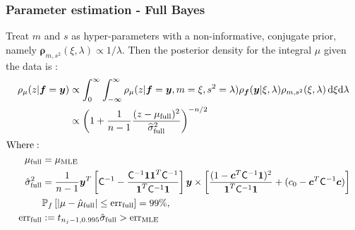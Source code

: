 \documentclass[10pt,compress,xcolor={usenames,dvipsnames}]{beamer} %
\newcommand{\bm}[1]{\boldsymbol{#1}}
\newcommand{\MLE}{\textup{MLE}}
\newcommand{\full}{\textup{full}}
\newcommand{\D}[1]{\text{d}{#1}}
\newcommand{\vrho}{\bm{\rho}}
\newcommand{\err}{{\text{err}}}
\begin{document}
\begin{frame}
\frametitle{Parameter estimation - Full Bayes}
\vspace*{-6ex}
Treat $m$ and $s$ as hyper-parameters with a non-informative, conjugate prior, namely $\vrho_{m,s^2}(\xi, \lambda) \propto 1/\lambda$.
Then the posterior density for the integral $\mu$ given the data is :
\vspace*{-2.0ex}
\begin{align*}
\rho_{\mu}(z | \vf = \vy)
& \propto \int_{0}^\infty \int_{-\infty}^\infty \rho_{\mu}(z | \vf = \vy, m = \xi, s^2 = \lambda)  
\rho_{\vf}(\vy | \xi, \lambda ) \rho_{m, s^2}(\xi, \lambda) \, \D \xi \D \lambda 
\\ & \propto \left(1 +  \frac{1}{n-1} \frac{(z - \mu_{\full})^2}{\widehat{\sigma}_{\full}^2} \right)^{-n/2}
\end{align*}
\pause
\vspace{-4ex}
\begin{align*}
\text{Where}: \;
\\
\mu_{\full} &= \mu_\MLE
\\
\hsigma^2_{\full} 
& = \frac{1}{n-1}
\vy^T\left[ \mC^{-1} 
- \frac{ \mC^{-1} \vone\vone^T \mC^{-1}}{\vone^T \mC^{-1} \vone}  \right]\vy
\times  \left[\frac{(1 - \vc^T \mC^{-1} \vone)^2}{\vone^T \mC^{-1} \vone} + (c_0  -\vc ^T \mC^{-1} \vc) \right]
\\ &\mathbb{P}_f \left[ |\mu-\hmu_{\full}|  \leq \err_{\full} \right]  = 99\%,
\\ \err_{\full} &:= t_{n_j-1,0.995} \hat{\sigma}_{\full} > \err_{\MLE}
\end{align*}
\end{frame}
\end{document}
